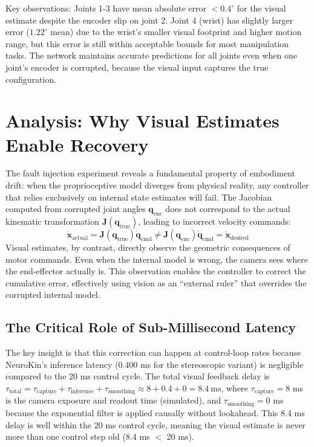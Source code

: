 \documentclass[12pt,a4paper,oneside]{report}
\begin{document}
Key observations: Joints 1-3 have mean absolute error $<0.4^\circ$ for the visual estimate despite the encoder slip on joint 2. Joint 4 (wrist) has slightly larger error ($1.22^\circ$ mean) due to the wrist's smaller visual footprint and higher motion range, but this error is still within acceptable bounds for most manipulation tasks. The network maintains accurate predictions for all joints even when one joint's encoder is corrupted, because the visual input captures the true configuration.

\section{Analysis: Why Visual Estimates Enable Recovery}

The fault injection experiment reveals a fundamental property of embodiment drift: when the proprioceptive model diverges from physical reality, any controller that relies exclusively on internal state estimates will fail. The Jacobian computed from corrupted joint angles $\mathbf{q}_{\text{enc}}$ does not correspond to the actual kinematic transformation $\mathbf{J}(\mathbf{q}_{\text{true}})$, leading to incorrect velocity commands:
\begin{equation}
\dot{\mathbf{x}}_{\text{actual}} = \mathbf{J}(\mathbf{q}_{\text{true}}) \dot{\mathbf{q}}_{\text{cmd}} \neq \mathbf{J}(\mathbf{q}_{\text{enc}}) \dot{\mathbf{q}}_{\text{cmd}} = \dot{\mathbf{x}}_{\text{desired}}
\end{equation}
Visual estimates, by contrast, directly observe the geometric consequences of motor commands. Even when the internal model is wrong, the camera sees where the end-effector actually is. This observation enables the controller to correct the cumulative error, effectively using vision as an ``external ruler'' that overrides the corrupted internal model.

\subsection{The Critical Role of Sub-Millisecond Latency}

The key insight is that this correction can happen at control-loop rates because NeuroKin's inference latency (0.400 ms for the stereoscopic variant) is negligible compared to the 20 ms control cycle. The total visual feedback delay is $\tau_{\text{total}} = \tau_{\text{capture}} + \tau_{\text{inference}} + \tau_{\text{smoothing}} \approx 8 + 0.4 + 0 = 8.4\ \text{ms}$, where $\tau_{\text{capture}} = 8$ ms is the camera exposure and readout time (simulated), and $\tau_{\text{smoothing}} = 0$ ms because the exponential filter is applied causally without lookahead. This 8.4 ms delay is well within the 20 ms control cycle, meaning the visual estimate is never more than one control step old (8.4 ms $<$ 20 ms).
\end{document}
